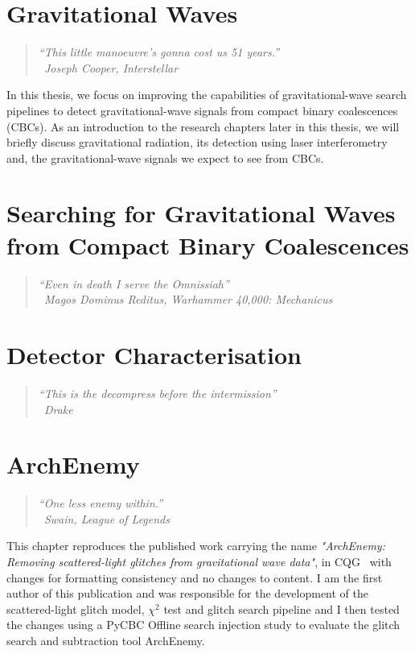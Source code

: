 \documentclass[a4paper,12pt,twoside]{report} %
\makeatletter
\newcommand{\chapterquote}[2]{
  \begin{quote}
    \color{darkgray}\itshape #1 \\[1ex] %
    \raggedleft %
    \textemdash\ #2
  \end{quote}
}
\newcommand{\gwadj}{gravitational-wave\xspace}
\renewcommand{\cleardoublepage}{%
  \clearpage%
  \if@twoside
    \ifodd\c@page
    \else
      \hbox{}%
      \thispagestyle{empty}%
      \newpage
    \fi
  \fi
}
\let\oldchapter\chapter
\renewcommand{\chapter}{\cleardoublepage\oldchapter}
\makeatother
\begin{document}
\chapter[Gravitational Waves]{\label{chapter:1-gravitational-waves}Gravitational Waves}
\chapterquote{``This little manoeuvre's gonna cost us 51 years.''}{Joseph Cooper, Interstellar}
In this thesis, we focus on improving the capabilities of \gwadj search pipelines to detect \gwadj signals from compact binary coalescences (CBCs). As an introduction to the research chapters later in this thesis, we will briefly discuss gravitational radiation, its detection using laser interferometry and, the \gwadj signals we expect to see from CBCs.


\chapter[Searching for Gravitational-Waves from Compact Binary Coalescences]{\label{chapter:2-searches}Searching for Gravitational Waves from Compact Binary Coalescences}
\chapterquote{``Even in death I serve the Omnissiah''}{Magos Dominus Reditus, Warhammer 40,000: Mechanicus}


\chapter[Detector Characterisation]{\label{chapter:3-detchar}Detector Characterisation}
\chapterquote{``This is the decompress before the intermission''}{Drake}


\chapter[ArchEnemy]{\label{chapter:4-archenemy}ArchEnemy}
\chapterquote{``One less enemy within.''}{Swain, League of Legends}
This chapter reproduces the published work carrying the name \textit{"ArchEnemy: Removing scattered-light glitches from gravitational wave data"}, in CQG~\cite{ArchEnemy:2023} with changes for formatting consistency and no changes to content. I am the first author of this publication and was responsible for the development of the scattered-light glitch model, $\chi^{2}$ test and glitch search pipeline and I then tested the changes using a PyCBC Offline search injection study to evaluate the glitch search and subtraction tool ArchEnemy. 

\end{document}
